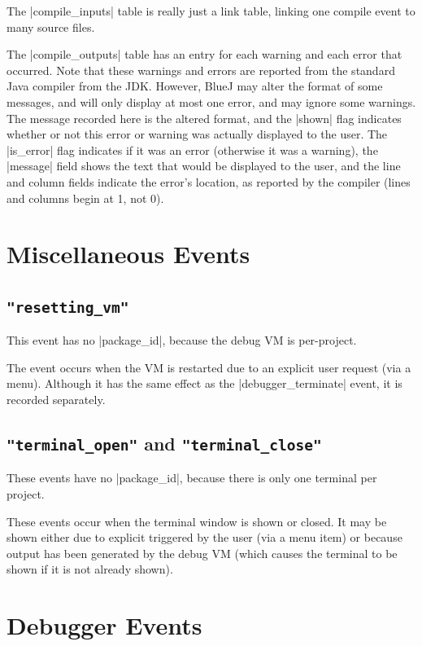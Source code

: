 \documentclass{report}
\begin{document}

The |compile_inputs| table is really just a link table, linking one compile
event to many source files.


The |compile_outputs| table has an entry for each warning and each error that
occurred.  Note that these warnings and errors are reported from the standard Java
compiler from the JDK.  However, BlueJ may alter the format of some messages,
and will only display at most one error, and may ignore some warnings.  The
message recorded here is the altered format, and the |shown| flag indicates
whether or not this error or warning was actually displayed to the user.  The
|is_error| flag indicates if it was an error (otherwise it was a warning), the
|message| field shows the text that would be displayed to the user, and the
line and column fields indicate the error's location, as reported by the
compiler  (lines and columns begin at 1, not 0).

\section{Miscellaneous Events}

\subsection{\lstinline!"resetting_vm"!}

This event has no |package_id|, because the debug VM is per-project.

The event occurs when the VM is restarted due to an explicit user request (via
a menu).  Although it has the same effect as the |debugger_terminate| event,
it is recorded separately.

\subsection{\lstinline!"terminal_open"! and \lstinline!"terminal_close"!}

These events have no |package_id|, because there is only one terminal
per project.

These events occur when the terminal window is shown or closed.  It
may be shown either due to explicit triggered by the user (via a menu
item) or because output has been generated by the debug VM (which
causes the terminal to be shown if it is not already shown).

\section{Debugger Events}
\end{document}
